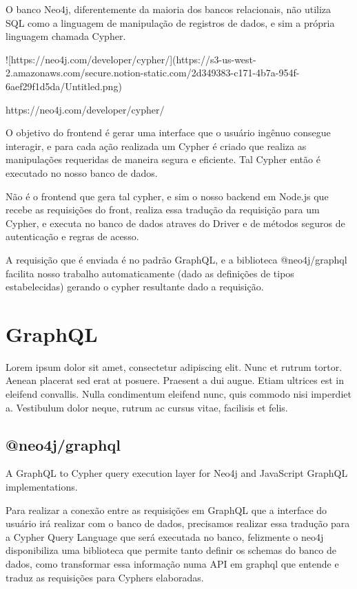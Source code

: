 O banco Neo4j, diferentemente da maioria dos bancos relacionais, não utiliza SQL como a linguagem de manipulação de registros de dados, e sim a própria linguagem chamada Cypher.

![https://neo4j.com/developer/cypher/](https://s3-us-west-2.amazonaws.com/secure.notion-static.com/2d349383-c171-4b7a-954f-6aef29f1d5da/Untitled.png)

https://neo4j.com/developer/cypher/

O objetivo do frontend é gerar uma interface que o usuário ingênuo consegue interagir, e para cada ação realizada um Cypher é criado que realiza as manipulações requeridas de maneira segura e eficiente. Tal Cypher então é executado no nosso banco de dados.

Não é o frontend que gera tal cypher, e sim o nosso backend em Node.js que recebe as requisições do front, realiza essa tradução da requisição para um Cypher, e executa no banco de dados atraves do Driver e de métodos seguros de autenticação e regras de acesso.

A requisição que é enviada é no padrão GraphQL, e a biblioteca @neo4j/graphql facilita nosso trabalho automaticamente (dado as definições de tipos estabelecidas) gerando o cypher resultante dado a requisição.
\section{GraphQL}

Lorem ipsum dolor sit amet, consectetur adipiscing elit. Nunc et rutrum tortor. Aenean placerat sed erat at posuere. Praesent a dui augue. Etiam ultrices est in eleifend convallis. Nulla condimentum eleifend nunc, quis commodo nisi imperdiet a. Vestibulum dolor neque, rutrum ac cursus vitae, facilisis et felis.

\subsection{@neo4j/graphql}
A GraphQL to Cypher query execution layer for Neo4j and JavaScript GraphQL implementations.

Para realizar a conexão entre as requisições em GraphQL que a interface do usuário irá realizar com o banco de dados, precisamos realizar essa tradução para a Cypher Query Language que será executada no banco, felizmente o neo4j disponibiliza uma biblioteca que permite tanto definir os schemas do banco de dados, como transformar essa informação numa API em graphql que entende e traduz as requisições para Cyphers elaboradas.

